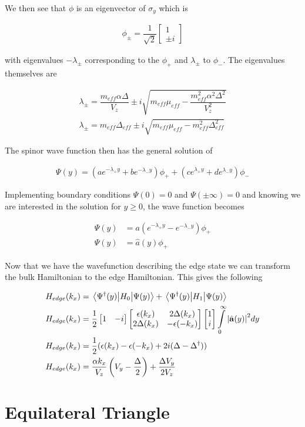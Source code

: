 We then see that $\phi$ is an eigenvector of $\sigma_y$ which is

\begin{align}
  \phi_{\pm} = \dfrac{1}{\sqrt{2}}
  \begin{bmatrix}
    1 \\
    \pm i
  \end{bmatrix}
\end{align}

with eigenvalues $-\lambda_{\pm}$ corresponding to the $\phi_+$ and $\lambda_{\pm}$ to $\phi_-$. The eigenvalues themselves are

\begin{align}
  \lambda_{\pm} = \dfrac{m_{eff}\alpha\Delta}{V_z} \pm i\sqrt{m_{eff}\mu_{eff}-\dfrac{m_{eff}^2\alpha^2\Delta^2}{V_z^2}} \\
  \lambda_{\pm} = m_{eff}\Delta_{eff} \pm i\sqrt{m_{eff}\mu_{eff}-m_{eff}^2\Delta_{eff}^2}
\end{align}

The spinor wave function then has the general solution of

\begin{align}
  \Psi(y) = (ae^{-\lambda_+y}+be^{-\lambda_-y})\phi_+ + (ce^{\lambda_+y}+de^{\lambda_-y})\phi_-
\end{align}

Implementing boundary conditions $\Psi(0)=0$ and $\Psi(\pm\infty)=0$ and knowing we are interested in the solution for $y\geq0$, the wave function becomes

\begin{align}
  \Psi(y) &= a(e^{-\lambda_+y}-e^{-\lambda_-y})\phi_+ \\
  \Psi(y) &= \hat{a}(y)\phi_+
\end{align}

Now that we have the wavefunction describing the edge state we can transform the bulk Hamiltonian to the edge Hamiltonian. This gives the following

\begin{align}
  H_{edge}(k_x) &= \matrixelement{\Psi^{\dagger}(y)}{H_0}{\Psi(y)} + \matrixelement{\Psi^{\dagger}(y)}{H_1}{\Psi(y)} \\
  H_{edge}(k_x) &= \dfrac{1}{2}
    \begin{bmatrix}
      1 & -i
    \end{bmatrix}
    \begin{bmatrix}
    \epsilon(k_x) & 2\Delta(k_x) \\
    2\Delta(k_x) & -\epsilon(-k_x)
    \end{bmatrix}
    \begin{bmatrix}
      1 \\
      i
    \end{bmatrix}
    \int\limits_0^{\infty} \abs{\hat{a}(y)}^2 dy \\
  H_{edge}(k_x) &= \dfrac{1}{2}(\epsilon(k_x)-\epsilon(-k_x) + 2i(\Delta-\Delta^{\dagger})) \\
  H_{edge}(k_x) &= \dfrac{\alpha k_x}{V_z}\left(V_y-\dfrac{\Delta}{2}\right)+\dfrac{\Delta V_y}{2V_z}
\end{align}


\section{Equilateral Triangle}



